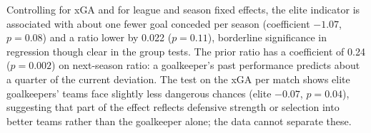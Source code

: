 \documentclass[11pt,a4paper]{article}
\begin{document}
\begin{table}
\begin{center}
\caption{Goalkeeper models (goals conceded vs xGA)}
\label{tab:p2_gk_models}
\end{center}
\end{table}

Controlling for xGA and for league and season fixed effects, the elite indicator is associated with about one fewer goal conceded per season (coefficient $-1.07$, $p=0.08$) and a ratio lower by 0.022 ($p=0.11$), borderline significance in regression though clear in the group tests. The prior ratio has a coefficient of 0.24 ($p=0.002$) on next-season ratio: a goalkeeper's past performance predicts about a quarter of the current deviation. The test on the xGA per match shows elite goalkeepers' teams face slightly less dangerous chances (elite $-0.07$, $p=0.04$), suggesting that part of the effect reflects defensive strength or selection into better teams rather than the goalkeeper alone; the data cannot separate these.
\end{document}
